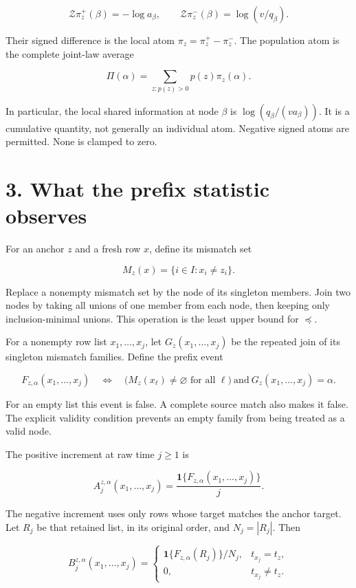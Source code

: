 \[
\mathcal Z\pi_z^+(\beta)=-\log a_\beta,
\qquad
\mathcal Z\pi_z^-(\beta)=\log(v/q_\beta).
\]

Their signed difference is the local atom \(\pi_z=\pi_z^+-\pi_z^-\). The population atom is the complete joint-law average

\[
\Pi(\alpha)=\sum_{z:p(z)>0}p(z)\pi_z(\alpha).
\]

In particular, the local shared information at node \(\beta\) is \(\log(q_\beta/(v a_\beta))\). It is a cumulative quantity, not generally an individual atom. Negative signed atoms are permitted. None is clamped to zero.

\section{3. What the prefix statistic observes}\label{what-the-prefix-statistic-observes}

For an anchor \(z\) and a fresh row \(x\), define its mismatch set

\[
M_z(x)=\{i\in I:x_i\ne z_i\}.
\]

Replace a nonempty mismatch set by the node of its singleton members. Join two nodes by taking all unions of one member from each node, then keeping only inclusion-minimal unions. This operation is the least upper bound for \(\preceq\).

For a nonempty row list \(x_1,\ldots,x_j\), let \(G_z(x_1,\ldots,x_j)\) be the repeated join of its singleton mismatch families. Define the prefix event

\[
F_{z,\alpha}(x_1,\ldots,x_j)
\quad\Longleftrightarrow\quad
\bigl(M_z(x_\ell)\ne\varnothing\text{ for all }\ell\bigr)
\ \text{and}\ G_z(x_1,\ldots,x_j)=\alpha.
\]

For an empty list this event is false. A complete source match also makes it false. The explicit validity condition prevents an empty family from being treated as a valid node.

The positive increment at raw time \(j\ge1\) is

\[
A_j^{z,\alpha}(x_1,\ldots,x_j)
=\frac{\mathbf1\{F_{z,\alpha}(x_1,\ldots,x_j)\}}{j}.
\]

The negative increment uses only rows whose target matches the anchor target. Let \(R_j\) be that retained list, in its original order, and \(N_j=|R_j|\). Then

\[
B_j^{z,\alpha}(x_1,\ldots,x_j)=
\begin{cases}
\mathbf1\{F_{z,\alpha}(R_j)\}/N_j,&t_{x_j}=t_z,\\
0,&t_{x_j}\ne t_z.
\end{cases}
\]

